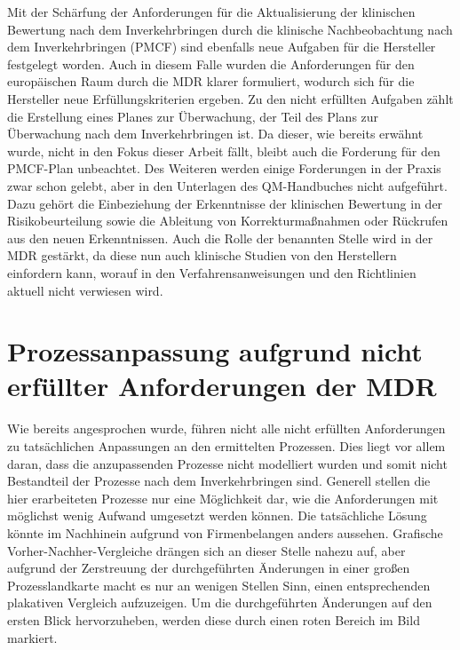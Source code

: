 \documentclass[a4paper,12pt]{report}
\begin{document}
Mit der Schärfung der Anforderungen für die Aktualisierung der klinischen Bewertung nach dem Inverkehrbringen durch die klinische Nachbeobachtung nach dem Inverkehrbringen (PMCF) sind ebenfalls neue Aufgaben für die Hersteller festgelegt worden. Auch in diesem Falle wurden die Anforderungen für den europäischen Raum durch die MDR klarer formuliert, wodurch sich für die Hersteller neue Erfüllungskriterien ergeben. Zu den nicht erfüllten Aufgaben zählt die Erstellung eines Planes zur Überwachung, der Teil des Plans zur Überwachung nach dem Inverkehrbringen ist. Da dieser, wie bereits erwähnt wurde, nicht in den Fokus dieser Arbeit fällt, bleibt auch die Forderung für den PMCF-Plan unbeachtet. Des Weiteren werden einige Forderungen in der Praxis zwar schon gelebt, aber in den Unterlagen des QM-Handbuches nicht aufgeführt. Dazu gehört die Einbeziehung der Erkenntnisse der klinischen Bewertung in der Risikobeurteilung sowie die Ableitung von Korrekturmaßnahmen oder Rückrufen aus den neuen Erkenntnissen. Auch die Rolle der benannten Stelle wird in der MDR gestärkt, da diese nun auch klinische Studien von den Herstellern einfordern kann, worauf in den Verfahrensanweisungen und den Richtlinien aktuell nicht verwiesen wird.

\section{Prozessanpassung aufgrund nicht erfüllter Anforderungen der MDR}
Wie bereits angesprochen wurde, führen nicht alle nicht erfüllten Anforderungen zu tatsächlichen Anpassungen an den ermittelten Prozessen. Dies liegt vor allem daran, dass die anzupassenden Prozesse nicht modelliert wurden und somit nicht Bestandteil der Prozesse nach dem Inverkehrbringen sind. Generell stellen die hier erarbeiteten Prozesse nur eine Möglichkeit dar, wie die Anforderungen mit möglichst wenig Aufwand umgesetzt werden können. Die tatsächliche Lösung könnte im Nachhinein aufgrund von Firmenbelangen anders aussehen. Grafische Vorher-Nachher-Vergleiche drängen sich an dieser Stelle nahezu auf, aber aufgrund der Zerstreuung der durchgeführten Änderungen in einer großen Prozesslandkarte macht es nur an wenigen Stellen Sinn, einen entsprechenden plakativen Vergleich aufzuzeigen. Um die durchgeführten Änderungen auf den ersten Blick hervorzuheben, werden diese durch einen roten Bereich im Bild markiert. 
\end{document}
